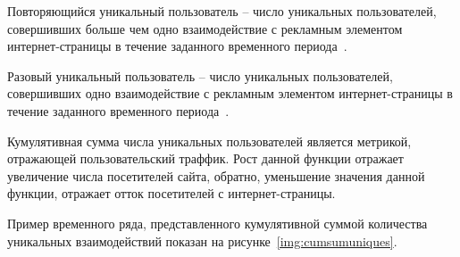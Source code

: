 Повторяющийся уникальный пользователь -- число уникальных пользователей, совершивших больше чем одно взаимодействие
с рекламным элементом интернет-страницы в течение заданного временного периода~\autocite{online:metrics}.

Разовый уникальный пользователь -- число уникальных пользователей, совершивших одно взаимодействие
с рекламным элементом интернет-страницы в течение заданного временного периода~\autocite{online:metrics}.

Кумулятивная сумма числа уникальных пользователей является метрикой, отражающей  пользовательский траффик. Рост данной
функции отражает увеличение числа посетителей сайта, обратно, уменьшение значения данной функции, отражает отток 
посетителей с интернет-страницы.

Пример временного ряда, представленного кумулятивной суммой количества уникальных взаимодействий показан на 
рисунке~\ref{img:cumsumuniques}.
